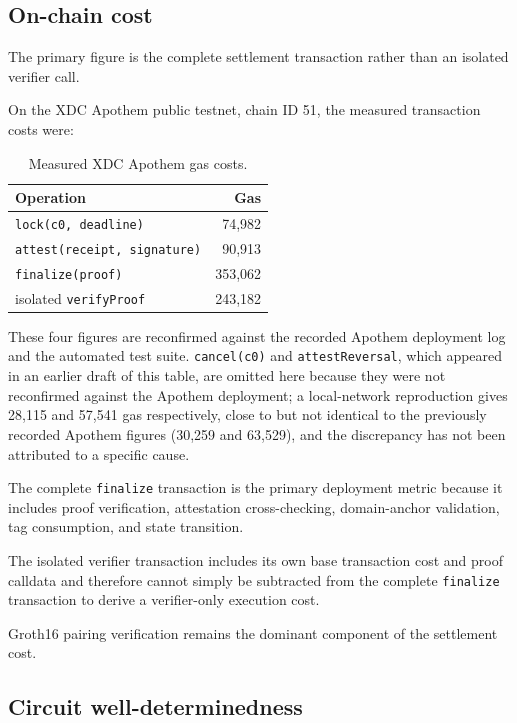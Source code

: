 \documentclass[10pt,twocolumn]{article}
\newcommand{\code}[1]{\texttt{#1}}
\begin{document}
\subsection{On-chain cost}

The primary figure is the complete settlement transaction rather than an
isolated verifier call.

On the XDC Apothem public testnet, chain ID 51, the measured transaction
costs were:

\begin{table}[t]
\centering
\begin{tabular}{@{}lr@{}}
\toprule
Operation & Gas \\
\midrule
\code{lock(c0, deadline)} & 74{,}982 \\
\code{attest(receipt, signature)} & 90{,}913 \\
\code{finalize(proof)} & 353{,}062 \\
isolated \code{verifyProof} & 243{,}182 \\
\bottomrule
\end{tabular}
\caption{Measured XDC Apothem gas costs.}
\end{table}

These four figures are reconfirmed against the recorded Apothem
deployment log and the automated test suite. \code{cancel(c0)} and
\code{attestReversal}, which appeared in an earlier draft of this table,
are omitted here because they were not reconfirmed against the Apothem
deployment; a local-network reproduction gives 28{,}115 and 57{,}541 gas
respectively, close to but not identical to the previously recorded
Apothem figures (30{,}259 and 63{,}529), and the discrepancy has not been
attributed to a specific cause.

The complete \code{finalize} transaction is the primary deployment
metric because it includes proof verification, attestation
cross-checking, domain-anchor validation, tag consumption, and state
transition.

The isolated verifier transaction includes its own base transaction cost
and proof calldata and therefore cannot simply be subtracted from the
complete \code{finalize} transaction to derive a verifier-only execution
cost.

Groth16 pairing verification remains the dominant component of the
settlement cost.

\subsection{Circuit well-determinedness}
\end{document}
